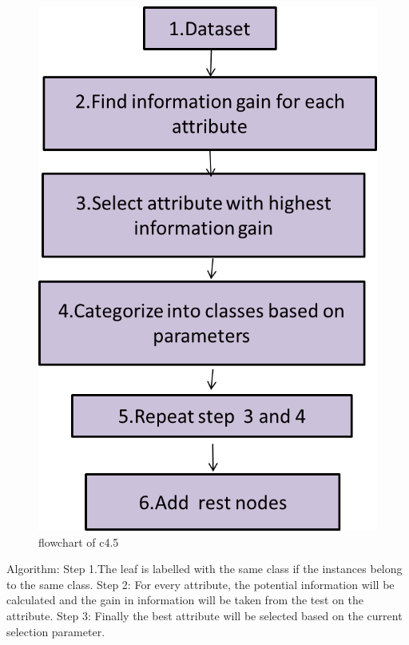 \documentclass[11pt]{article}
\begin{document}
\begin{figure}[!h]
\centering
\includegraphics[scale=0.7]{c45}
\caption{flowchart of c4.5}
\label{fig_sin}
\end{figure}
Algorithm:
Step 1.The leaf is labelled with the same class if the instances belong to the same class. 
Step 2: For every attribute, the potential information will be calculated and the gain in information will be taken from the test on the attribute. 
Step 3: Finally the best attribute will be selected based on the current selection parameter.
\end{document}
